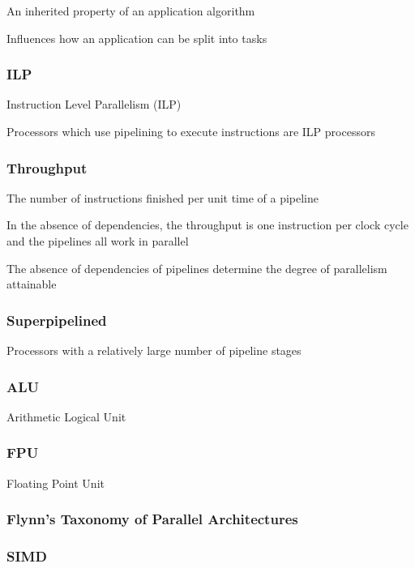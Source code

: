 \documentclass{article}
\begin{document}
An inherited property of an application algorithm

Influences how an application can be split into tasks

\subsubsection{ILP}

Instruction Level Parallelism (ILP)

Processors which use pipelining to execute instructions are ILP processors

\subsubsection{Throughput}

The number of instructions finished per unit time of a pipeline

In the absence of dependencies, the throughput is one instruction per clock cycle and the pipelines all work in parallel

The absence of dependencies of pipelines determine the degree of parallelism attainable

\subsubsection{Superpipelined}

Processors with a relatively large number of pipeline stages

\subsubsection{ALU}

Arithmetic Logical Unit

\subsubsection{FPU}

Floating Point Unit 

\subsubsection{Flynn's Taxonomy of Parallel Architectures}

\subsubsection{SIMD}
\end{document}
